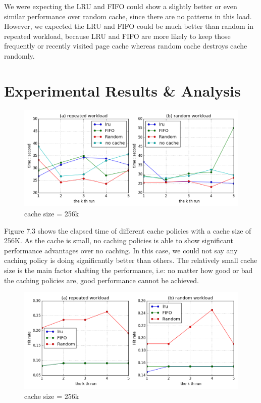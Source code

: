 \documentclass[paper=a4, fontsize=11pt]{scrartcl} %
\numberwithin{equation}{section} %
\numberwithin{figure}{section} %
\numberwithin{table}{section} %
\begin{document}
We were expecting the LRU and FIFO could show a slightly better or even similar performance over random cache, since there are no patterns in this load. However, we expected the LRU and FIFO could be much better than random in repeated workload, because LRU and FIFO are more likely to keep those frequently or recently visited page cache whereas random cache destroys cache randomly. 

\section{Experimental Results \& Analysis}
\begin{figure}[h]
  \centering
  \includegraphics[width=\textwidth]{../data/time256k}
  \caption{cache size = 256k}
  \label{fig:time256k}
\end{figure}
Figure 7.3 shows the elapsed time of different cache policies with a cache size of 256K. As the cache is small, no caching policies is able to show significant performance advantages over no caching. In this case, we could not say any caching policy is doing significantly better than others. The relatively small cache size is the main factor shafting the performance, i.e: no matter how good or bad the caching policies are, good performance cannot be achieved.
\begin{figure}[h]
  \centering
  \includegraphics[width=\textwidth]{../data/hit256k}
  \caption{cache size = 256k}
  \label{fig:hit256k}
\end{figure}
\end{document}
